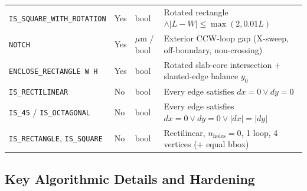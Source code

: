 \begin{table}[htbp]
\begin{tabular}{@{}llll@{}}
\texttt{IS\_SQUARE\_WITH\_ROTATION} & Yes & bool & Rotated rectangle $\land |L - W| \le \max(2, 0.01 L)$ \\
\texttt{NOTCH} & Yes & $\mu\text{m}$ / bool & Exterior CCW-loop gap (X-sweep, off-boundary, non-crossing) \\
\texttt{ENCLOSE\_RECTANGLE W H} & Yes & bool & Rotated slab-core intersection + slanted-edge balance $y_0$ \\
\midrule
\texttt{IS\_RECTILINEAR} & No & bool & Every edge satisfies $dx = 0 \lor dy = 0$ \\
\texttt{IS\_45} / \texttt{IS\_OCTAGONAL} & No & bool & Every edge satisfies $dx = 0 \lor dy = 0 \lor |dx| = |dy|$ \\
\texttt{IS\_RECTANGLE}, \texttt{IS\_SQUARE} & No & bool & Rectilinear, $n_{\text{holes}}=0$, 1 loop, 4 vertices (+ equal bbox) \\
\bottomrule
\end{tabular}
\end{table}

\subsection{Key Algorithmic Details and Hardening}

